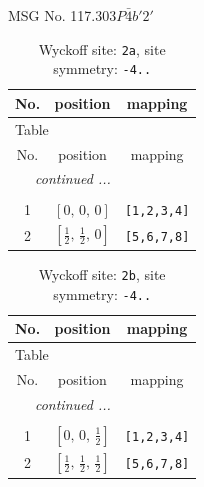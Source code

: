 \documentclass[fleqn,8pt]{jsarticle}
\begin{document}
\setcounter{MaxMatrixCols}{32}

\renewcommand{\tablename}{Table~}
\renewcommand{\figurename}{Figure~}
\begin{center}
\LARGE
MSG No. 117.303\quad$P\bar{4}b'2'$
\end{center}
\renewcommand{\arraystretch}{1.2}
\begin{longtable}{ccc}
\caption{Wyckoff site: {\tt 2a}, site symmetry: {\tt -4..}}
 \\
 \hline \hline
No. & position & mapping \\ \hline \endfirsthead

\multicolumn{2}{l}{\tablename\ \thetable{}} \\
 \hline \hline
No. & position & mapping \\ \hline \endhead

 \hline \hline
\multicolumn{2}{r}{\footnotesize\it continued ...} \\ \endfoot

 \hline \hline
\multicolumn{2}{r}{} \\ \endlastfoot

1 & $\left[ 0,\, 0,\, 0 \right]$ & {\tt [1,2,3,4]} \\ \hline
2 & $\left[ \frac{1}{2},\, \frac{1}{2},\, 0 \right]$ & {\tt [5,6,7,8]} \\
\end{longtable}
\renewcommand{\arraystretch}{1.2}
\begin{longtable}{ccc}
\caption{Wyckoff site: {\tt 2b}, site symmetry: {\tt -4..}}
 \\
 \hline \hline
No. & position & mapping \\ \hline \endfirsthead

\multicolumn{2}{l}{\tablename\ \thetable{}} \\
 \hline \hline
No. & position & mapping \\ \hline \endhead

 \hline \hline
\multicolumn{2}{r}{\footnotesize\it continued ...} \\ \endfoot

 \hline \hline
\multicolumn{2}{r}{} \\ \endlastfoot

1 & $\left[ 0,\, 0,\, \frac{1}{2} \right]$ & {\tt [1,2,3,4]} \\ \hline
2 & $\left[ \frac{1}{2},\, \frac{1}{2},\, \frac{1}{2} \right]$ & {\tt [5,6,7,8]} \\
\end{longtable}
\end{document}
